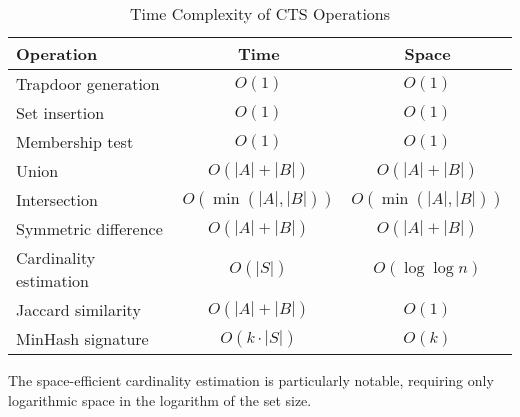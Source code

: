 \documentclass[../main_comprehensive.tex]{subfiles}
\begin{document}
\begin{table}[h]
\centering
\caption{Time Complexity of CTS Operations}
\begin{tabular}{lcc}
\toprule
Operation & Time & Space \\
\midrule
Trapdoor generation & $O(1)$ & $O(1)$ \\
Set insertion & $O(1)$ & $O(1)$ \\
Membership test & $O(1)$ & $O(1)$ \\
Union & $O(|A| + |B|)$ & $O(|A| + |B|)$ \\
Intersection & $O(\min(|A|, |B|))$ & $O(\min(|A|, |B|))$ \\
Symmetric difference & $O(|A| + |B|)$ & $O(|A| + |B|)$ \\
Cardinality estimation & $O(|S|)$ & $O(\log \log n)$ \\
Jaccard similarity & $O(|A| + |B|)$ & $O(1)$ \\
MinHash signature & $O(k \cdot |S|)$ & $O(k)$ \\
\bottomrule
\end{tabular}
\end{table}

The space-efficient cardinality estimation is particularly notable, requiring only logarithmic space in the logarithm of the set size.
\end{document}
